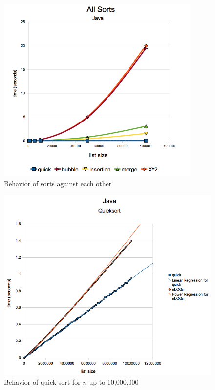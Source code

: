 \documentclass[12pt]{amsart}
\begin{document}
\begin{figure}[h]
  \centering
    \includegraphics[width=0.9\textwidth]{JAllSorts.png}
  \caption{Behavior of sorts against each other}
\end{figure}

\begin{figure}[h]
  \centering
    \includegraphics[width=1.0\textwidth]{JHardcoreQS.png}
  \caption{Behavior of quick sort for $n$ up to 10,000,000}
\end{figure}
\end{document}
